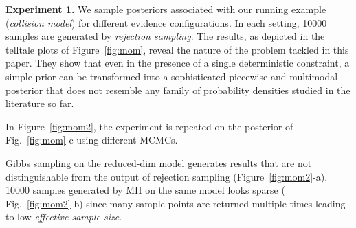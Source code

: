 \documentclass{article}
\begin{document}
{%

\textbf{Experiment 1.} We sample posteriors associated with our running example (\emph{collision model}) for different evidence configurations.
In each setting, 10000 samples are generated by \emph{rejection sampling}.
The results, as depicted in the telltale plots of Figure~\ref{fig:mom}, reveal the nature of the problem tackled in this paper.
They show that even in the presence of a single deterministic constraint, 
a simple prior can be transformed into a sophisticated piecewise and multimodal posterior that does not resemble any family of 
probability densities studied in the literature so far. 

In Figure~\ref{fig:mom2}, the experiment is repeated on the posterior of 
Fig.~\ref{fig:mom}-c using different MCMCs.%

 
Gibbs sampling on the {\color{green} reduced-dim} model generates results that are not distinguishable from the output of rejection sampling
(Figure~\ref{fig:mom2}-a).
10000 samples generated by MH on the same model looks sparse ( Fig.~\ref{fig:mom2}-b) since many sample points are returned multiple times leading to low \emph{effective sample size}.

}
\end{document}
